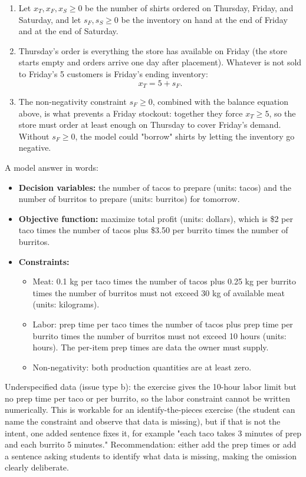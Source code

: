 
\begin{enumerate}
\item Let $x_T, x_F, x_S \geq 0$ be the number of shirts ordered on Thursday, Friday, and Saturday, and let $s_F, s_S \geq 0$ be the inventory on hand at the end of Friday and at the end of Saturday.
\item Thursday's order is everything the store has available on Friday (the store starts empty and orders arrive one day after placement). Whatever is not sold to Friday's 5 customers is Friday's ending inventory:
\[
x_T = 5 + s_F .
\]
\item The non-negativity constraint $s_F \geq 0$, combined with the balance equation above, is what prevents a Friday stockout: together they force $x_T \geq 5$, so the store must order at least enough on Thursday to cover Friday's demand. Without $s_F \geq 0$, the model could "borrow" shirts by letting the inventory go negative.
\end{enumerate}


A model answer in words:
\begin{itemize}
\item \textbf{Decision variables:} the number of tacos to prepare (units: tacos) and the number of burritos to prepare (units: burritos) for tomorrow.
\item \textbf{Objective function:} maximize total profit (units: dollars), which is \$2 per taco times the number of tacos plus \$3.50 per burrito times the number of burritos.
\item \textbf{Constraints:}
  \begin{itemize}
  \item Meat: 0.1 kg per taco times the number of tacos plus 0.25 kg per burrito times the number of burritos must not exceed 30 kg of available meat (units: kilograms).
  \item Labor: prep time per taco times the number of tacos plus prep time per burrito times the number of burritos must not exceed 10 hours (units: hours). The per-item prep times are data the owner must supply.
  \item Non-negativity: both production quantities are at least zero.
  \end{itemize}
\end{itemize}

\begin{qaflag}
Underspecified data (issue type b): the exercise gives the 10-hour labor limit but no prep time per taco or per burrito, so the labor constraint cannot be written numerically. This is workable for an identify-the-pieces exercise (the student can name the constraint and observe that data is missing), but if that is not the intent, one added sentence fixes it, for example "each taco takes 3 minutes of prep and each burrito 5 minutes." Recommendation: either add the prep times or add a sentence asking students to identify what data is missing, making the omission clearly deliberate.
\end{qaflag}

